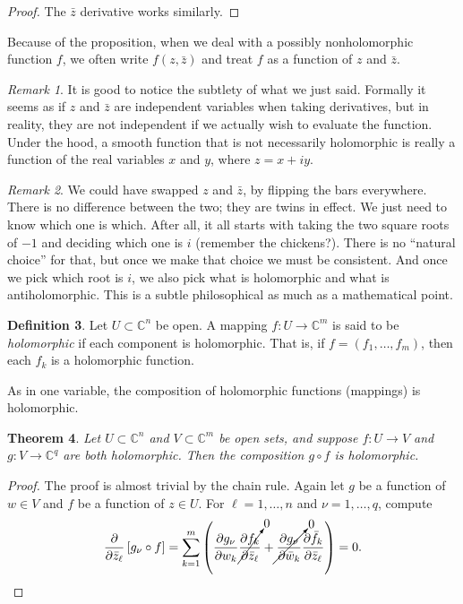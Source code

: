 \documentclass[12pt,openany]{book}
\newcommand{\C}{{\mathbb{C}}}
\theoremstyle{plain}
\newtheorem{thm}{Theorem}[section]
\theoremstyle{remark}
\newtheorem{remark}[thm]{Remark}
\theoremstyle{definition}
\newtheorem{defn}[thm]{Definition}
\theoremstyle{exercise}
\theoremstyle{example}
\begin{document}
\begin{proof}
The $\bar{z}$ derivative works similarly.
\end{proof}

Because of the proposition,
when we deal with a possibly
nonholomorphic function $f$, we often write $f(z,\bar{z})$ and treat $f$ as
a function of $z$ and $\bar{z}$.

\begin{remark}
It is good to notice the subtlety of what we just said.  Formally it seems
as if $z$ and $\bar{z}$ are independent variables when taking
derivatives, but in reality, they are not independent if we actually wish to
evaluate the function.  Under the hood, a smooth function that is not
necessarily holomorphic is really a function of the real variables
$x$ and $y$, where $z = x+iy$.
\end{remark}

\begin{remark}
We could have swapped $z$ and $\bar{z}$, by
flipping the bars everywhere.  There is no difference between the two;
they are twins in effect.  We just need to know which one is which.
After all, it all starts with taking the two square roots of $-1$ and
deciding which one is $i$ (remember the chickens?).
There is no ``natural choice'' for that, but once
we make that choice we must be consistent.  And once we pick which
root
is $i$, we also pick what is holomorphic and what is
antiholomorphic.  This is a subtle philosophical as much as a mathematical point.
\end{remark}

\begin{defn}
Let $U \subset \C^n$ be open.  A mapping $f \colon U \to \C^m$
is said to be \emph{holomorphic}
if each component is holomorphic.  That
is, if $f = (f_1,\ldots,f_m)$, then each $f_k$ is a holomorphic function.
\end{defn}

As in one variable, the composition of holomorphic functions (mappings) is
holomorphic.

\begin{thm}
Let $U \subset \C^n$ and $V \subset \C^m$ be open sets, and suppose
$f \colon U \to V$ and $g \colon V \to \C^q$ are both holomorphic.
%
Then the composition $g \circ f$ is holomorphic.
\end{thm}

\begin{proof}
The proof is almost trivial by the chain rule.
Again let $g$ be a function of $w \in V$ and $f$ be a function of $z \in U$.
For $\ell = 1,\ldots,n$ and $\nu=1,\ldots,q$, compute
\begin{equation*}
\frac{\partial}{\partial \bar{z}_\ell} \left[ g_\nu \circ f \right]
=
\sum_{k=1}^m
\left(
\frac{\partial g_\nu}{\partial w_k}
\cancelto{0}{\frac{\partial f_k}{\partial \bar{z}_\ell}}
+
\cancelto{0}{\frac{\partial g_\nu}{\partial \bar{w}_k}}
\frac{\partial \bar{f}_k}{\partial \bar{z}_\ell}
\right)
=
0 . \qedhere
\end{equation*}
\end{proof}
\end{document}
